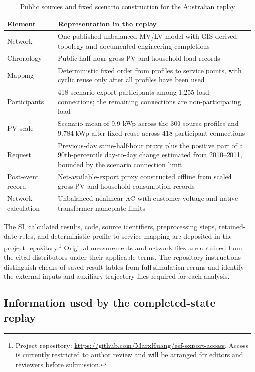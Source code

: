 \documentclass[11pt]{article}
\newcommand{\repositoryurl}{\url{https://github.com/MarxHuang/ecf-export-access}}
\begin{document}
\begin{table}[!ht]
\centering
\caption{Public sources and fixed scenario construction for the Australian replay}
\label{tab:supp_au_sources}
\small
\begin{tabular}{@{}p{}p{}@{}}
\toprule
Element & Representation in the replay \\
\midrule
Network & One published unbalanced MV/LV model with GIS-derived topology and
documented engineering completions \\
Chronology & Public half-hour gross PV and household load records \\
Mapping & Deterministic fixed order from profiles to service points, with cyclic reuse
only after all profiles have been used \\
Participants & 418 scenario export participants among 1,255 load connections;
the remaining connections are non-participating load \\
PV scale & Scenario mean of 9.9 kWp across the 300 source profiles and 9.784 kWp
after fixed reuse across 418 participant connections \\
Request & Previous-day same-half-hour proxy plus the positive part of a
90th-percentile day-to-day change estimated from 2010--2011, bounded by the
scenario connection limit \\
Post-event record & Net-available-export proxy constructed offline from scaled
gross-PV and household-consumption records \\
Network calculation & Unbalanced nonlinear AC with customer-voltage and native
transformer-nameplate limits \\
\bottomrule
\end{tabular}
\end{table}

The SI, calculated results, code, source identifiers, preprocessing steps,
retained-date rules, and deterministic profile-to-service mapping are deposited
in the project repository.\footnote{Project repository: \repositoryurl. Access
is currently restricted to author review and will be arranged for editors and
reviewers before submission.} Original measurements and network files are
obtained from the cited distributors under their applicable terms.
The repository instructions distinguish checks of saved result tables from
full simulation reruns and identify the external inputs and auxiliary
trajectory files required for each analysis.

\subsection{Information used by the completed-state replay}
\label{supp:au_information}
\end{document}
